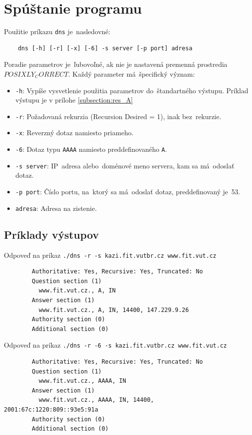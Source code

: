 \documentclass[a4paper, 11pt]{article}
\begin{document}
	\section{Spúštanie programu}
	Použitie príkazu \texttt{dns} je~nasledovné:
	\begin{verbatim}
	dns [-h] [-r] [-x] [-6] -s server [-p port] adresa
	\end{verbatim}
	Poradie parametrov je~ľubovoľné, ak nie je nastavená premenná prostredia $POSIXLY_CORRECT$. Každý parameter má~špecifický význam:
	\begin{itemize}
		\item \texttt{-h}: Vypíše vysvetlenie použitia parametrov do~štandartného výstupu. Príklad výstupu je v prílohe \ref{subsection:res_A}
		\item \texttt{-r}: Požadovaná rekurzia (Recursion Desired = 1), inak bez~rekurzie.
		\item \texttt{-x}: Reverzný dotaz namiesto priameho.
		\item \texttt{-6}: Dotaz typu \texttt{AAAA} namiesto preddefinovaného \texttt{A}.
		\item \texttt{-s server}: IP~adresa alebo~doménové meno servera, kam sa má~odoslať dotaz.
		\item \texttt{-p port}: Číslo portu, na~ktorý sa má~odoslať dotaz, preddefinovaný je~53.
		\item \texttt{adresa}: Adresa na zistenie.
	\end{itemize}
	
	\subsection{Príklady výstupov}
	\noindent Odpoveď na príkaz \texttt{./dns -r -s kazi.fit.vutbr.cz www.fit.vut.cz}
	\begin{verbatim}
		Authoritative: Yes, Recursive: Yes, Truncated: No
		Question section (1)
		  www.fit.vut.cz., A, IN
		Answer section (1)
		  www.fit.vut.cz., A, IN, 14400, 147.229.9.26
		Authority section (0)
		Additional section (0)
	\end{verbatim}

	\noindent Odpoveď na príkaz \texttt{./dns -r -6 -s kazi.fit.vutbr.cz www.fit.vut.cz}
	\begin{verbatim}
		Authoritative: Yes, Recursive: Yes, Truncated: No
		Question section (1)
		  www.fit.vut.cz., AAAA, IN
		Answer section (1)
		  www.fit.vut.cz., AAAA, IN, 14400, 2001:67c:1220:809::93e5:91a
		Authority section (0)
		Additional section (0)
	\end{verbatim}
\end{document}
